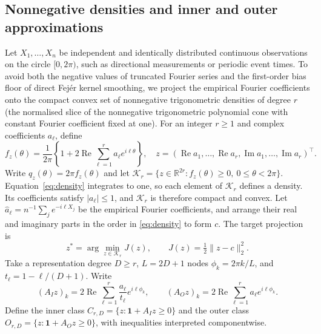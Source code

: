 \subsection{Nonnegative densities and inner and outer approximations}
Let \(X_1,\dots,X_n\) be independent and identically distributed continuous observations on the circle \([0,2\pi)\), such as directional measurements or periodic event times. To avoid both the negative values of truncated Fourier series and the first-order bias floor of direct Fejér kernel smoothing, we project the empirical Fourier coefficients onto the compact convex set of nonnegative trigonometric densities of degree \(r\) (the normalised slice of the nonnegative trigonometric polynomial cone with constant Fourier coefficient fixed at one). For an integer \(r\ge1\) and complex coefficients \(a_\ell\), define
\begin{equation}
f_z(\theta)=\frac1{2\pi}\left\{1+2\operatorname{Re}\sum_{\ell=1}^r a_\ell e^{i\ell\theta}\right\},\quad
z=(\operatorname{Re}a_1,\ldots,\operatorname{Re}a_r,\operatorname{Im}a_1,\ldots,\operatorname{Im}a_r)^\top .
\label{eq:density}
\end{equation}
Write \(q_z(\theta)=2\pi f_z(\theta)\) and let \(\mathcal K_r=\{z\in\mathbb R^{2r}: f_z(\theta)\ge0,\ 0\le\theta<2\pi\}\). Equation~\eqref{eq:density} integrates to one, so each element of \(\mathcal K_r\) defines a density. Its coefficients satisfy \(|a_\ell|\le1\), and \(\mathcal K_r\) is therefore compact and convex. Let \(\hat a_\ell=n^{-1}\sum_j e^{-i\ell X_j}\) be the empirical Fourier coefficients, and arrange their real and imaginary parts in the order in \eqref{eq:density} to form \(c\). The target projection is
\begin{equation}
z^*=\arg\min_{z\in\mathcal K_r}J(z),\qquad J(z)=\tfrac12\|z-c\|_2^2.
\label{eq:projection}
\end{equation}
Take a representation degree \(D\ge r\), \(L=2D+1\) nodes \(\phi_k=2\pi k/L\), and \(t_\ell=1-\ell/(D+1)\). Write
\begin{equation}
(A_Iz)_k=2\operatorname{Re}\sum_{\ell=1}^r\frac{a_\ell}{t_\ell}e^{i\ell\phi_k},\qquad
(A_Oz)_k=2\operatorname{Re}\sum_{\ell=1}^ra_\ell e^{i\ell\phi_k}.
\label{eq:matrices}
\end{equation}
Define the inner class \(C_{r,D}=\{z:\mathbf1+A_Iz\ge0\}\) and the outer class \(O_{r,D}=\{z:\mathbf1+A_Oz\ge0\}\), with inequalities interpreted componentwise.


